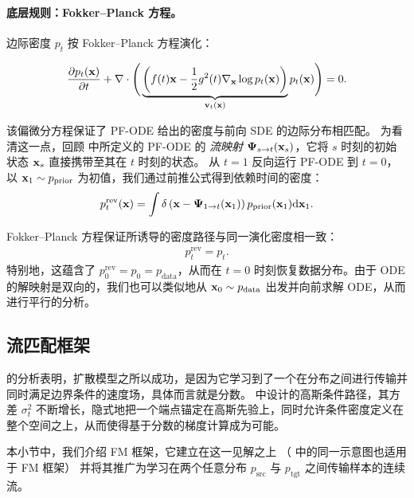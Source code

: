 \paragraph{底层规则：Fokker–Planck 方程。}
边际密度 $p_t$ 按 Fokker–Planck 方程演化：
\begin{mdframed}
\begin{align*}
    \frac{\partial p_t({\mathbf{x}})}{\partial t} + \nabla \cdot \Bigg( \underbrace{\left(f(t){\mathbf{x}} - \frac{1}{2}g^2(t) \nabla_{\mathbf{x}} \log p_t({\mathbf{x}})\right)}_{{\mathbf{v}}_t({\mathbf{x}})}  p_t({\mathbf{x}}) \Bigg) = 0.
\end{align*}
\end{mdframed}
该偏微分方程保证了 PF-ODE 给出的密度与前向 SDE 的边际分布相匹配。
为看清这一点，回顾  中所定义的 PF-ODE 的 \emph{流映射} ${\bm{\Psi}}_{s \to t}({\mathbf{x}}_s)$，它将 $s$ 时刻的初始状态 ${\mathbf{x}}_s$ 直接携带至其在 $t$ 时刻的状态。
从 $t=1$ 反向运行 PF-ODE 到 $t=0$，以 ${\mathbf{x}}_1 \sim p_{\mathrm{prior}}$ 为初值，我们通过前推公式得到依赖时间的密度：
\begin{align}\label{eq:pushforward-ode}
    p_t^{\mathrm{rev}}({\mathbf{x}})
    = \int \delta \left({\mathbf{x}} - {\bm{\Psi}}_{1 \to t}({\mathbf{x}}_1)\right) 
      p_{\mathrm{prior}}({\mathbf{x}}_1) \mathrm{d}{\mathbf{x}}_1.
\end{align}

Fokker–Planck 方程保证所诱导的密度路径与同一演化密度相一致：
\begin{align}\label{eq:p_t-fwd-rev}
p_t^{\mathrm{rev}} = p_t.
\end{align}
特别地，这蕴含了 $p_0^{\mathrm{rev}} = p_0 = p_{\text{data}}$，从而在 $t=0$ 时刻恢复数据分布。由于 ODE 的解映射是双向的，我们也可以类似地从
${\mathbf{x}}_0 \sim p_{\text{data}}$ 出发并向前求解 ODE，从而进行平行的分析。


\subsection{流匹配框架}\label{subsec:fm-framework}

 的分析表明，扩散模型之所以成功，是因为它学习到了一个在分布之间进行传输并同时满足边界条件的速度场，具体而言就是分数。 中设计的高斯条件路径，其方差 $\sigma_t^2$ 不断增长，隐式地把一个端点锚定在高斯先验上，同时允许条件密度定义在整个空间之上，从而使得基于分数的梯度计算成为可能。

本小节中，我们介绍 FM 框架，它建立在这一见解之上
（ 中的同一示意图也适用于 FM 框架）
并将其推广为学习在两个任意分布
$p_{\text{src}}$ 与 $p_{\text{tgt}}$ 之间传输样本的连续流。





